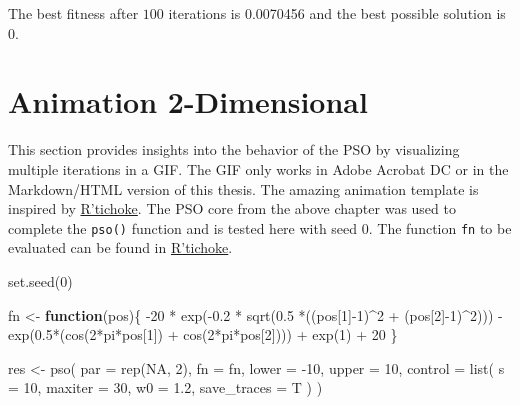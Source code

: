 \documentclass[
  oneside]{book}
\newenvironment{Shaded}{\begin{snugshade}}{\end{snugshade}}
\newcommand{\AttributeTok}[1]{\textcolor[rgb]{0.77,0.63,0.00}{#1}}
\newcommand{\ConstantTok}[1]{\textcolor[rgb]{0.00,0.00,0.00}{#1}}
\newcommand{\ControlFlowTok}[1]{\textcolor[rgb]{0.13,0.29,0.53}{\textbf{#1}}}
\newcommand{\DecValTok}[1]{\textcolor[rgb]{0.00,0.00,0.81}{#1}}
\newcommand{\FloatTok}[1]{\textcolor[rgb]{0.00,0.00,0.81}{#1}}
\newcommand{\FunctionTok}[1]{\textcolor[rgb]{0.00,0.00,0.00}{#1}}
\newcommand{\NormalTok}[1]{#1}
\newcommand{\OtherTok}[1]{\textcolor[rgb]{0.56,0.35,0.01}{#1}}
\newcommand{\SpecialCharTok}[1]{\textcolor[rgb]{0.00,0.00,0.00}{#1}}
\begin{document}
The best fitness after \(100\) iterations is 0.0070456 and the best possible solution is \(0\).

\hypertarget{animation-2-dimensional}{%
\section{Animation 2-Dimensional}\label{animation-2-dimensional}}

This section provides insights into the behavior of the PSO by visualizing multiple iterations in a GIF. The GIF only works in Adobe Acrobat DC or in the Markdown/HTML version of this thesis. The amazing animation template is inspired by \href{https://www.r-bloggers.com/2021/10/how-to-build-a-basic-particle-swarm-optimiser-from-scratch-in-r/}{R'tichoke}. The PSO core from the above chapter was used to complete the \texttt{pso()} function and is tested here with seed 0. The function \texttt{fn} to be evaluated can be found in \href{https://www.r-bloggers.com/2021/10/how-to-build-a-basic-particle-swarm-optimiser-from-scratch-in-r/}{R'tichoke}.

\begin{Shaded}
\begin{Highlighting}[]
\FunctionTok{set.seed}\NormalTok{(}\DecValTok{0}\NormalTok{)}

\NormalTok{fn }\OtherTok{\textless{}{-}} \ControlFlowTok{function}\NormalTok{(pos)\{}
  \SpecialCharTok{{-}}\DecValTok{20} \SpecialCharTok{*} \FunctionTok{exp}\NormalTok{(}\SpecialCharTok{{-}}\FloatTok{0.2} \SpecialCharTok{*} \FunctionTok{sqrt}\NormalTok{(}\FloatTok{0.5} \SpecialCharTok{*}\NormalTok{((pos[}\DecValTok{1}\NormalTok{]}\SpecialCharTok{{-}}\DecValTok{1}\NormalTok{)}\SpecialCharTok{\^{}}\DecValTok{2} \SpecialCharTok{+}\NormalTok{ (pos[}\DecValTok{2}\NormalTok{]}\SpecialCharTok{{-}}\DecValTok{1}\NormalTok{)}\SpecialCharTok{\^{}}\DecValTok{2}\NormalTok{))) }\SpecialCharTok{{-}} 
  \FunctionTok{exp}\NormalTok{(}\FloatTok{0.5}\SpecialCharTok{*}\NormalTok{(}\FunctionTok{cos}\NormalTok{(}\DecValTok{2}\SpecialCharTok{*}\NormalTok{pi}\SpecialCharTok{*}\NormalTok{pos[}\DecValTok{1}\NormalTok{]) }\SpecialCharTok{+} \FunctionTok{cos}\NormalTok{(}\DecValTok{2}\SpecialCharTok{*}\NormalTok{pi}\SpecialCharTok{*}\NormalTok{pos[}\DecValTok{2}\NormalTok{]))) }\SpecialCharTok{+} 
  \FunctionTok{exp}\NormalTok{(}\DecValTok{1}\NormalTok{) }\SpecialCharTok{+} \DecValTok{20}
\NormalTok{\}}

\NormalTok{res }\OtherTok{\textless{}{-}} \FunctionTok{pso}\NormalTok{(}
  \AttributeTok{par =} \FunctionTok{rep}\NormalTok{(}\ConstantTok{NA}\NormalTok{, }\DecValTok{2}\NormalTok{),}
  \AttributeTok{fn =}\NormalTok{ fn,}
  \AttributeTok{lower =} \SpecialCharTok{{-}}\DecValTok{10}\NormalTok{,}
  \AttributeTok{upper =} \DecValTok{10}\NormalTok{,}
  \AttributeTok{control =} \FunctionTok{list}\NormalTok{(}
    \AttributeTok{s =} \DecValTok{10}\NormalTok{,}
    \AttributeTok{maxiter =} \DecValTok{30}\NormalTok{,}
    \AttributeTok{w0 =} \FloatTok{1.2}\NormalTok{,}
    \AttributeTok{save\_traces =}\NormalTok{ T}
\NormalTok{  )}
\NormalTok{)}
\end{Highlighting}
\end{Shaded}
\end{document}
